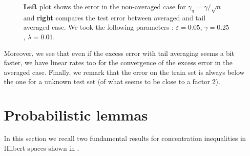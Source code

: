 \begin{figure}[ht]
\footnotesize
{}%
\hspace{1cm}%
\vspace{-0.8cm}
\caption{ \small {\bfseries Left} plot shows the error in the non-averaged case for $\gamma_n = \gamma / \sqrt{n}$ and {\bfseries right} compares the test error between averaged and tail averaged case. We took the following parameters :  $\varepsilon = 0.05$, $\gamma = 0.25$, $\lambda = 0.01$.}
\label{fig:techplots}
\end{figure}

Moreover, we see that even if the excess error with tail averaging seems a bit faster, we have linear rates too for the convergence of the excess error in the averaged case. Finally, we remark that the error on the train set is always below the one for a unknown test set (of what seems to be close to a factor 2).





 \section{Probabilistic lemmas} \label{sec:proba}

In this section we recall two fundamental results for concentration inequalities in Hilbert spaces shown in \citet{pinelis1994optimum}.

